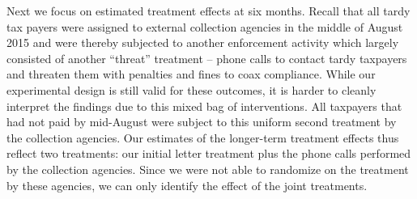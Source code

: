 \documentclass[12pt]{article}
\begin{document}
Next we focus on estimated treatment effects at six months. Recall that all tardy tax
payers were assigned to external collection agencies in the middle of August
2015 and were thereby subjected to another enforcement activity which largely
consisted of another ``threat'' treatment --  phone calls to contact tardy
taxpayers and threaten them with penalties and fines to coax compliance. 
While our experimental design is still valid for these outcomes,
it is harder to cleanly interpret the findings due to this mixed bag of interventions.
All taxpayers that had not
paid by mid-August were subject to this uniform second treatment by the 
collection agencies.  Our estimates of the longer-term treatment
effects thus reflect two treatments: our initial letter treatment plus
the phone calls performed by the collection agencies. Since we were
not able to randomize on the treatment by these agencies, we
can only identify the effect of the joint treatments.
\end{document}
